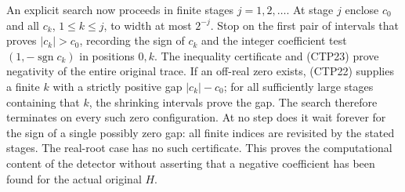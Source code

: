 An explicit search now proceeds in finite stages $j=1,2,\ldots$.
At stage $j$ enclose $c_0$ and all $c_k$, $1\le k\le j$,
to width at most $2^{-j}$. Stop on the first pair of intervals
that proves $|c_k|>c_0$, recording the sign of $c_k$ and the
integer coefficient test $(1,-\operatorname{sgn}c_k)$ in
positions $0,k$. The inequality certificate and (CTP23)
prove negativity of the entire original trace. If an off-real
zero exists, (CTP22) supplies a finite $k$ with a strictly
positive gap $|c_k|-c_0$; for all sufficiently large stages
containing that $k$, the shrinking intervals prove the gap.
The search therefore terminates on every such zero configuration.
At no step does it wait forever for the sign of a single
possibly zero gap: all finite indices are revisited by the
stated stages. The real-root case has no such certificate.
This proves the computational content of the detector without
asserting that a negative coefficient has been found for the
actual original $H$.
